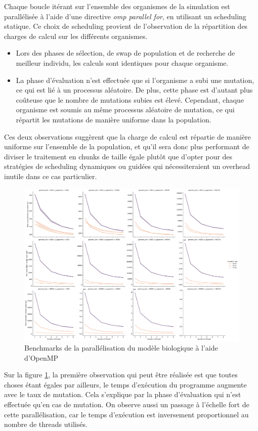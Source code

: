 \documentclass[a4paper, 10pt, twoside]{article}
\begin{document}
Chaque boucle itérant sur l'ensemble des organismes de la simulation est parallélisée à l'aide d'une directive \textit{omp parallel for}, en utilisant un scheduling statique. Ce choix de scheduling provient de l'observation de la répartition des charges de calcul sur les différents organismes.

\begin{itemize}
	\item Lors des phases de sélection, de swap de population et de recherche de meilleur individu, les calculs sont identiques pour chaque organisme.
	\item La phase d'évaluation n'est effectuée que si l'organisme a subi une mutation, ce qui est lié à un processus aléatoire. De plus, cette phase est d'autant plus coûteuse que le nombre de mutations subies est élevé. Cependant, chaque organisme est soumis au même processus aléatoire de mutation, ce qui répartit les mutations de manière uniforme dans la population.
\end{itemize}

Ces deux observations suggèrent que la charge de calcul est répartie de manière uniforme sur l'ensemble de la population, et qu'il sera donc plus performant de diviser le traitement en chunks de taille égale plutôt que d'opter pour des stratégies de scheduling dynamiques ou guidées qui nécessiteraient un overhead inutile dans ce cas particulier.

\begin{figure}[htbp]
	\centering
	\includegraphics[width=0.7\linewidth]{img/benchmark_omp_static.pdf}
	\caption{Benchmarks de la parallélisation du modèle biologique à l'aide d'OpenMP}
	\label{fig:benchmarks/omp}
\end{figure}

Sur la figure \ref{fig:benchmarks/omp}, la première observation qui peut être réalisée est que toutes choses étant égales par ailleurs, le temps d'exécution du programme augmente avec le taux de mutation. Cela s'explique par la phase d'évaluation qui n'est effectuée qu'en cas de mutation. On observe aussi un passage à l'échelle fort de cette parallélisation, car le temps d'exécution est inversement proportionnel au nombre de threads utilisés.
\end{document}

